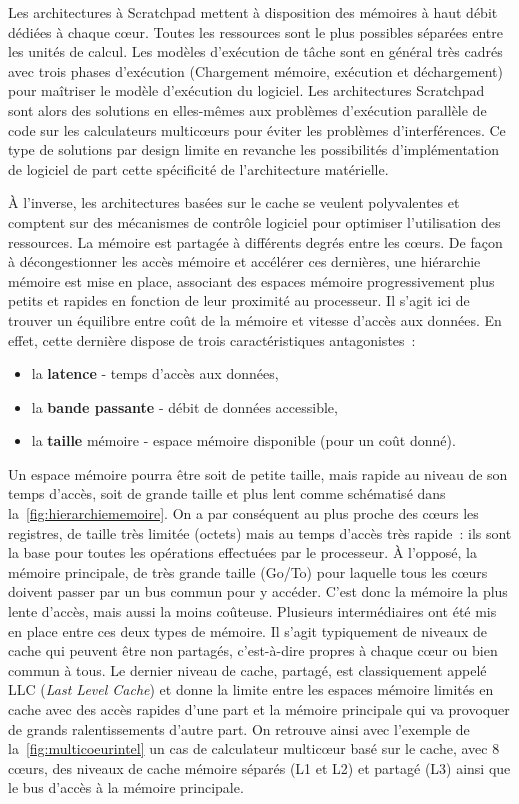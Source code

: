 \documentclass[french, a4paper, 11pt, twoside, pdftex]{StyleThese}
\begin{document}
		Les architectures à Scratchpad mettent à disposition des mémoires à haut débit dédiées à chaque cœur. Toutes les ressources sont le plus possibles séparées entre les unités de calcul. Les modèles d'exécution de tâche sont en général très cadrés avec trois phases d'exécution (Chargement mémoire, exécution et déchargement) pour maîtriser le modèle d'exécution du logiciel. Les architectures Scratchpad sont alors des solutions en elles-mêmes aux problèmes d'exécution parallèle de code sur les calculateurs multicœurs pour éviter les problèmes d'interférences. Ce type de solutions par design limite en revanche les possibilités d'implémentation de logiciel de part cette spécificité de l'architecture matérielle.
			
		À l'inverse, les architectures basées sur le cache se veulent polyvalentes et comptent sur des mécanismes de contrôle logiciel pour optimiser l'utilisation des ressources.
		La mémoire est partagée à différents degrés entre les cœurs. De façon à décongestionner les accès mémoire et accélérer ces dernières, une hiérarchie mémoire est mise en place, associant des espaces mémoire progressivement plus petits et rapides en fonction de leur proximité au processeur. Il s'agit ici de trouver un équilibre entre coût de la mémoire et vitesse d'accès aux données. En effet,  cette dernière dispose de trois caractéristiques antagonistes~:
			\begin{itemize}
				\item la \textbf{latence} - temps d'accès aux données, 
				\item la \textbf{bande passante} - débit de données accessible,
				\item la \textbf{taille} mémoire - espace mémoire disponible (pour un coût donné).
			\end{itemize}
		Un espace mémoire pourra être soit de petite taille, mais rapide au niveau de son temps d'accès, soit de grande taille et plus lent comme schématisé dans la~\autoref{fig:hierarchiememoire}.  On a par conséquent au plus proche des cœurs les registres, de taille très limitée (octets) mais au temps d'accès très rapide~: ils sont la base pour toutes les opérations effectuées par le processeur. À l'opposé, la mémoire principale, de très grande taille (Go/To) pour laquelle tous les cœurs doivent passer par un bus commun pour y accéder. C'est donc la mémoire la plus lente d'accès, mais aussi la moins coûteuse. Plusieurs intermédiaires ont été mis en place entre ces deux types de mémoire. Il s'agit typiquement de niveaux de cache qui peuvent être non partagés, c'est-à-dire propres à chaque cœur ou bien commun à tous. Le dernier niveau de cache, partagé, est classiquement appelé LLC (\emph{Last Level Cache}) et donne la limite entre les espaces mémoire limités en cache avec des accès rapides d'une part et la mémoire principale qui va provoquer de grands ralentissements d'autre part. 			
		On retrouve ainsi avec l'exemple de la~\autoref{fig:multicoeurintel} un cas de calculateur multicœur basé sur le cache, avec 8 cœurs, des niveaux de cache mémoire séparés (L1 et L2) et partagé (L3) ainsi que le bus d'accès à la mémoire principale. 
		
\end{document}
